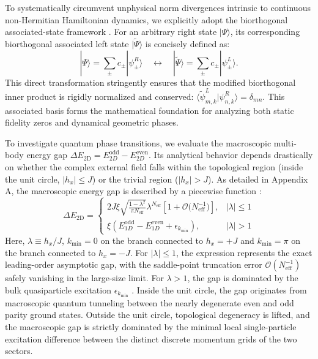 \documentclass[aps,prb,floatfix,superscriptaddress,reprint]{revtex4-2}
\begin{document}
To systematically circumvent unphysical norm divergences intrinsic to continuous non-Hermitian Hamiltonian dynamics, we explicitly adopt the biorthogonal associated-state framework \cite{Hu2024_1}. For an arbitrary right state $|\Psi\rangle$, its corresponding biorthogonal associated left state $|\tilde{\Psi}\rangle$ is concisely defined as:
\begin{equation}
   |\Psi\rangle = \sum_{\pm} c_{\pm} |\psi_{\pm}^R\rangle \quad \leftrightarrow \quad |\tilde{\Psi}\rangle = \sum_{\pm} c_{\pm} |\psi_{\pm}^L\rangle.
    \label{eq:associated_state}
\end{equation}
This direct transformation stringently ensures that the modified biorthogonal inner product is rigidly normalized and conserved: $\langle \tilde{\psi}_{m,k}^L | \psi_{n,k}^R \rangle = \delta_{mn}$. This associated basis forms the mathematical foundation for analyzing both static fidelity zeros and dynamical geometric phases.

To investigate quantum phase transitions, we evaluate the macroscopic multi-body energy gap $\Delta E_{\mathrm{2D}} = E_{2D}^{\mathrm{odd}} - E_{2D}^{\mathrm{even}}$. Its analytical behavior depends drastically on whether the complex external field falls within the topological region (inside the unit circle, $|h_x| \le J$) or the trivial region ($|h_x| > J$). As detailed in Appendix \textcolor[rgb]{0.00,0.07,1.00}{A}, the macroscopic energy gap is described by a piecewise function :
\begin{equation}
    \Delta E_{\mathrm{2D}} =
    \begin{cases}
     2 J \xi \sqrt{ \frac{1 - \lambda^2}{\pi N_{\mathrm{eff}}} } \lambda^{N_{\mathrm{eff}}} \left[ 1 + \mathcal{O}\big( N_{\mathrm{eff}}^{-1} \big) \right], & |\lambda| \le 1 \\
     \xi \left(E_{1D}^{\mathrm{ odd}} - E_{1D}^{\mathrm{even}} + \epsilon_{k_{\mathrm{min}}}\right), & |\lambda| > 1
    \end{cases}
    \label{eq:piecewise_gap}
\end{equation}
Here, $\lambda \equiv h_x/J$, $k_{\mathrm{min}} = 0$ on the branch connected to $h_{x} = +J$ and
$k_{\mathrm{min}} = \pi$ on the branch connected to $h_{x} =-J$. For $|\lambda| \le 1$, the expression represents the exact leading-order asymptotic gap, with the saddle-point truncation error $\mathcal{O}(N_{\mathrm{eff}}^{-1})$ safely vanishing in the large-size limit. For $\lambda > 1$, the gap is dominated by the bulk quasiparticle excitation $\epsilon_{k_{\mathrm{min}}}$ \cite{FineSize1987}. Inside the unit circle, the gap originates from macroscopic quantum tunneling between the nearly degenerate even and odd parity ground states. Outside the unit circle, topological degeneracy is lifted, and the macroscopic gap is strictly dominated by the minimal local single-particle excitation difference between the distinct discrete momentum grids of the two sectors.
\end{document}
